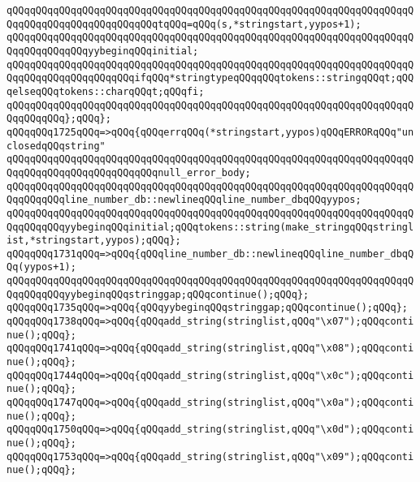 \verb|qQQqqQQqqQQqqQQqqQQqqQQqqQQqqQQqqQQqqQQqqQQqqQQqqQQqqQQqqQQqqQQqqQQqqQQqqQQqqQQqqQQqqQQqqQQqqQQqtqQQq=qQQq(s,*stringstart,yypos+1);|\newline
\verb|qQQqqQQqqQQqqQQqqQQqqQQqqQQqqQQqqQQqqQQqqQQqqQQqqQQqqQQqqQQqqQQqqQQqqQQqqQQqqQQqqQQqyybeginqQQqinitial;|\newline
\verb|qQQqqQQqqQQqqQQqqQQqqQQqqQQqqQQqqQQqqQQqqQQqqQQqqQQqqQQqqQQqqQQqqQQqqQQqqQQqqQQqqQQqqQQqqQQqifqQQq*stringtypeqQQqqQQqtokens::stringqQQqt;qQQqelseqQQqtokens::charqQQqt;qQQqfi;|\newline
\verb|qQQqqQQqqQQqqQQqqQQqqQQqqQQqqQQqqQQqqQQqqQQqqQQqqQQqqQQqqQQqqQQqqQQqqQQqqQQqqQQq};qQQq};|\newline
\verb|qQQqqQQq1725qQQq=>qQQq{qQQqerrqQQq(*stringstart,yypos)qQQqERRORqQQq"unclosedqQQqstring"|\newline
\verb|qQQqqQQqqQQqqQQqqQQqqQQqqQQqqQQqqQQqqQQqqQQqqQQqqQQqqQQqqQQqqQQqqQQqqQQqqQQqqQQqqQQqqQQqqQQqqQQqnull_error_body;|\newline
\verb|qQQqqQQqqQQqqQQqqQQqqQQqqQQqqQQqqQQqqQQqqQQqqQQqqQQqqQQqqQQqqQQqqQQqqQQqqQQqqQQqline_number_db::newlineqQQqline_number_dbqQQqyypos;|\newline
\verb|qQQqqQQqqQQqqQQqqQQqqQQqqQQqqQQqqQQqqQQqqQQqqQQqqQQqqQQqqQQqqQQqqQQqqQQqqQQqqQQqyybeginqQQqinitial;qQQqtokens::string(make_stringqQQqstringlist,*stringstart,yypos);qQQq};|\newline
\verb|qQQqqQQq1731qQQq=>qQQq{qQQqline_number_db::newlineqQQqline_number_dbqQQq(yypos+1);|\newline
\verb|qQQqqQQqqQQqqQQqqQQqqQQqqQQqqQQqqQQqqQQqqQQqqQQqqQQqqQQqqQQqqQQqqQQqqQQqqQQqqQQqyybeginqQQqstringgap;qQQqcontinue();qQQq};|\newline
\verb|qQQqqQQq1735qQQq=>qQQq{qQQqyybeginqQQqstringgap;qQQqcontinue();qQQq};|\newline
\verb|qQQqqQQq1738qQQq=>qQQq{qQQqadd_string(stringlist,qQQq"\x07");qQQqcontinue();qQQq};|\newline
\verb|qQQqqQQq1741qQQq=>qQQq{qQQqadd_string(stringlist,qQQq"\x08");qQQqcontinue();qQQq};|\newline
\verb|qQQqqQQq1744qQQq=>qQQq{qQQqadd_string(stringlist,qQQq"\x0c");qQQqcontinue();qQQq};|\newline
\verb|qQQqqQQq1747qQQq=>qQQq{qQQqadd_string(stringlist,qQQq"\x0a");qQQqcontinue();qQQq};|\newline
\verb|qQQqqQQq1750qQQq=>qQQq{qQQqadd_string(stringlist,qQQq"\x0d");qQQqcontinue();qQQq};|\newline
\verb|qQQqqQQq1753qQQq=>qQQq{qQQqadd_string(stringlist,qQQq"\x09");qQQqcontinue();qQQq};|\newline
